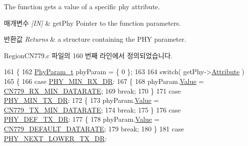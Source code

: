 The function gets a value of a specific phy attribute. 


\begin{DoxyParams}{매개변수}
{\em \mbox{[}\+I\+N\mbox{]}} & get\+Phy Pointer to the function parameters.\\
\hline
\end{DoxyParams}

\begin{DoxyRetVals}{반환값}
{\em Returns} & a structure containing the P\+HY parameter. \\
\hline
\end{DoxyRetVals}


Region\+C\+N779.\+c 파일의 160 번째 라인에서 정의되었습니다.


\begin{DoxyCode}
161 \{
162     \mbox{\hyperlink{unionu_phy_param}{PhyParam\_t}} phyParam = \{ 0 \};
163 
164     \textcolor{keywordflow}{switch}( getPhy->\mbox{\hyperlink{structs_get_phy_params_abdcb168ffd6913b85e2f635d7a475f2d}{Attribute}} )
165     \{
166         \textcolor{keywordflow}{case} \mbox{\hyperlink{group___r_e_g_i_o_n_gga51cbe8f5433d914fe9cf81b451de2c2da91cb5d84f937c32cd635dd7efe7a9d3a}{PHY\_MIN\_RX\_DR}}:
167         \{
168             phyParam.\mbox{\hyperlink{unionu_phy_param_a8e0dcce3428a8051614e852b8836d0d1}{Value}} = \mbox{\hyperlink{group___r_e_g_i_o_n_c_n779_ga9b8a3086475f37d72484e75a4bf8f4a5}{CN779\_RX\_MIN\_DATARATE}};
169             \textcolor{keywordflow}{break};
170         \}
171         \textcolor{keywordflow}{case} \mbox{\hyperlink{group___r_e_g_i_o_n_gga51cbe8f5433d914fe9cf81b451de2c2daace3e56c88b40def8ed6a9106871e7de}{PHY\_MIN\_TX\_DR}}:
172         \{
173             phyParam.\mbox{\hyperlink{unionu_phy_param_a8e0dcce3428a8051614e852b8836d0d1}{Value}} = \mbox{\hyperlink{group___r_e_g_i_o_n_c_n779_ga78e9e4ce4dd6df844573865d9de7e268}{CN779\_TX\_MIN\_DATARATE}};
174             \textcolor{keywordflow}{break};
175         \}
176         \textcolor{keywordflow}{case} \mbox{\hyperlink{group___r_e_g_i_o_n_gga51cbe8f5433d914fe9cf81b451de2c2da70c3923333165960549162e3dcf10467}{PHY\_DEF\_TX\_DR}}:
177         \{
178             phyParam.\mbox{\hyperlink{unionu_phy_param_a8e0dcce3428a8051614e852b8836d0d1}{Value}} = \mbox{\hyperlink{group___r_e_g_i_o_n_c_n779_ga442dfac2a5611f9e14fb748376e99b3e}{CN779\_DEFAULT\_DATARATE}};
179             \textcolor{keywordflow}{break};
180         \}
181         \textcolor{keywordflow}{case} \mbox{\hyperlink{group___r_e_g_i_o_n_gga51cbe8f5433d914fe9cf81b451de2c2dac002e7e492cf30dbf9c544b062f5cc8a}{PHY\_NEXT\_LOWER\_TX\_DR}}:

\end{DoxyCode}
